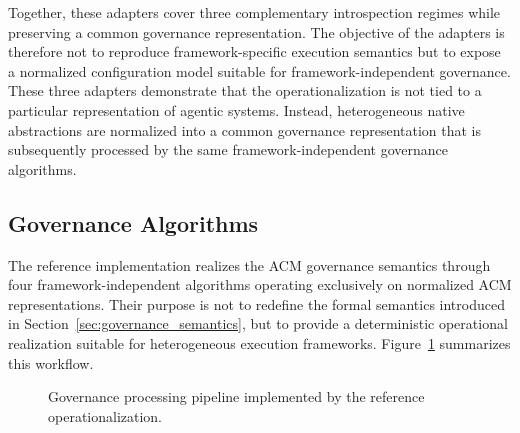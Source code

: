 \documentclass[10pt]{article}
\begin{document}
Together, these adapters cover three complementary introspection regimes while preserving a common governance representation. The objective of the adapters is therefore not to reproduce framework-specific execution semantics but to expose a normalized configuration model suitable for framework-independent governance.
These three adapters demonstrate that the operationalization is not tied to a particular representation of agentic systems. Instead, heterogeneous native abstractions are normalized into a common governance representation that is subsequently processed by the same framework-independent governance algorithms.

\subsection{Governance Algorithms}
\label{sec:governance_algorithms}

The reference implementation realizes the ACM governance semantics through four framework-independent algorithms operating exclusively on normalized ACM representations. Their purpose is not to redefine the formal semantics introduced in Section~\ref{sec:governance_semantics}, but to provide a deterministic operational realization suitable for heterogeneous execution frameworks. Figure~\ref{fig:governance_processing_pipeline} summarizes this workflow.

\begin{figure}[ht]
\centering
{}

\caption{Governance processing pipeline implemented by the reference operationalization.}
\label{fig:governance_processing_pipeline}
\end{figure}
\end{document}
